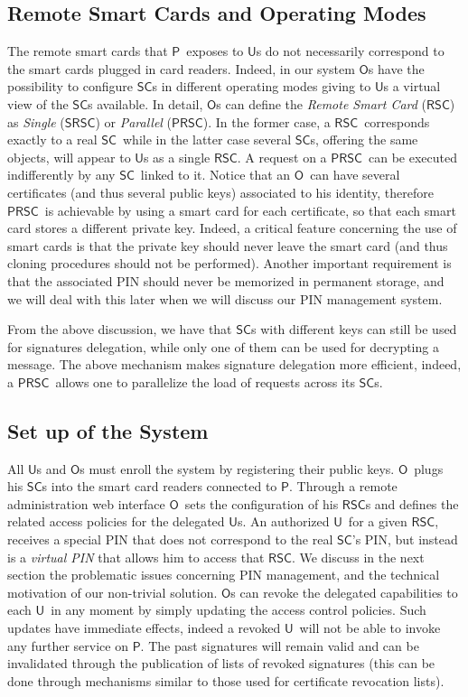 \documentclass[preprint,authoryear,12pt]{elsarticle}
\newcommand{\Owner}{\ensuremath{\mathsf{O}}}
\newcommand{\User}{\ensuremath{\mathsf{U}}}
\newcommand{\Proxy}{\ensuremath{\mathsf{P}}}
\newcommand{\SC}{\ensuremath{\mathsf{SC}}}
\newcommand{\RSC}{\ensuremath{\mathsf{RSC}}}
\newcommand{\SRSC}{\ensuremath{\mathsf{SRSC}}}
\newcommand{\PRSC}{\ensuremath{\mathsf{PRSC}}}
\begin{document}
\subsection{Remote Smart Cards and Operating Modes}
The remote smart cards that \Proxy\ exposes to \User s do not necessarily correspond to the smart cards plugged in card readers. Indeed, in our system \Owner s have the possibility to configure \SC s in different operating modes giving to \User s a virtual view of the \SC s available. In detail, \Owner s can define the \emph{Remote Smart Card} (\RSC) as \emph{Single} (\SRSC) or \emph{Parallel} (\PRSC). In the former case, a \RSC\ corresponds exactly to a real \SC\ while in the latter case several \SC s, offering the same objects, will appear to \User s as a single \RSC . A request on a \PRSC\ can be executed indifferently by any \SC\ linked to it. 
Notice that an \Owner\ can have several certificates (and thus several public keys) associated to his identity, therefore \PRSC\ is achievable by using a smart card for each certificate, so that each smart card stores a different private key. Indeed, a critical feature concerning the use of smart cards is that the private key should never leave the smart card (and thus cloning procedures should not be performed). 
Another important requirement is that the associated PIN should never be memorized in permanent storage, and we will deal with this later when we will discuss our PIN management system.

From the above discussion, we have that  \SC s with different keys can still be used for signatures delegation,  while only one of them can be used for decrypting a message. The above mechanism makes signature delegation more efficient, indeed, a \PRSC\ allows one to parallelize the load of requests across its \SC s.

\subsection{Set up of the System}
All \User s and \Owner s must enroll the system by registering their public keys. \Owner\ plugs his \SC s into the smart card readers connected to \Proxy. Through a remote administration web interface \Owner\ sets the configuration of his \RSC s and defines the related access policies for the delegated \User s.
An authorized \User\ for a given \RSC, receives a special PIN that does not correspond to the real \SC 's PIN, but instead is a \emph{virtual PIN} that allows him to access  that \RSC. We discuss in the next section the problematic issues concerning  PIN management, and the technical motivation of our non-trivial solution. 
\Owner s can revoke the delegated capabilities to each \User\ in any moment by simply updating the access control policies. Such updates have immediate effects, indeed a revoked \User\ will not be able to invoke any further service on \Proxy . The past signatures will remain valid and 
can be invalidated through the publication of lists of revoked signatures (this can be done through mechanisms similar to those used for certificate
revocation lists). 
\end{document}
